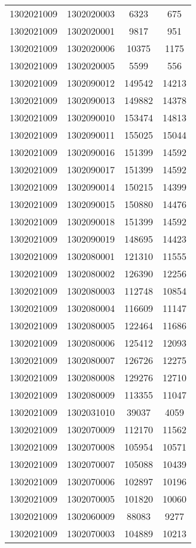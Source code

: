 \begin{longtable}[h]{llcc}
		1302021009 & 1302020003 & 6323 & 675\\
		1302021009 & 1302020001 & 9817 & 951\\
		1302021009 & 1302020006 & 10375 & 1175\\
		1302021009 & 1302020005 & 5599 & 556\\
		1302021009 & 1302090012 & 149542 & 14213\\
		1302021009 & 1302090013 & 149882 & 14378\\
		1302021009 & 1302090010 & 153474 & 14813\\
		1302021009 & 1302090011 & 155025 & 15044\\
		1302021009 & 1302090016 & 151399 & 14592\\
		1302021009 & 1302090017 & 151399 & 14592\\
		1302021009 & 1302090014 & 150215 & 14399\\
		1302021009 & 1302090015 & 150880 & 14476\\
		1302021009 & 1302090018 & 151399 & 14592\\
		1302021009 & 1302090019 & 148695 & 14423\\
		1302021009 & 1302080001 & 121310 & 11555\\
		1302021009 & 1302080002 & 126390 & 12256\\
		1302021009 & 1302080003 & 112748 & 10854\\
		1302021009 & 1302080004 & 116609 & 11147\\
		1302021009 & 1302080005 & 122464 & 11686\\
		1302021009 & 1302080006 & 125412 & 12093\\
		1302021009 & 1302080007 & 126726 & 12275\\
		1302021009 & 1302080008 & 129276 & 12710\\
		1302021009 & 1302080009 & 113355 & 11047\\
		1302021009 & 1302031010 & 39037 & 4059\\
		1302021009 & 1302070009 & 112170 & 11562\\
		1302021009 & 1302070008 & 105954 & 10571\\
		1302021009 & 1302070007 & 105088 & 10439\\
		1302021009 & 1302070006 & 102897 & 10196\\
		1302021009 & 1302070005 & 101820 & 10060\\
		1302021009 & 1302060009 & 88083 & 9277\\
		1302021009 & 1302070003 & 104889 & 10213\\

\end{longtable}
